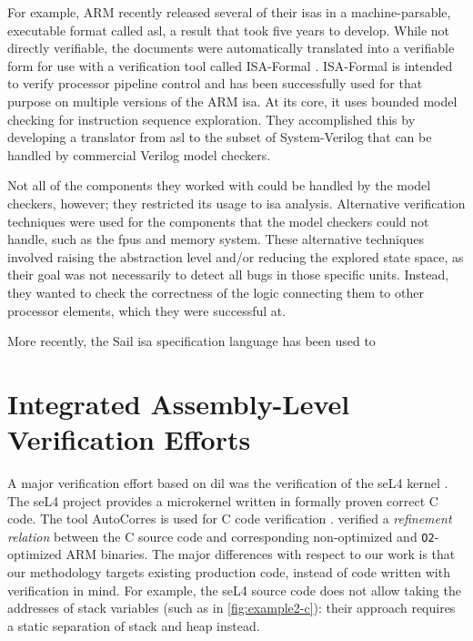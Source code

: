 For example, ARM recently released several of their \acp{isa} in a machine-parsable,
executable format called \ac{asl}, a result that took five years to develop.
While not directly verifiable, the documents were automatically translated into
a verifiable form for use with a verification tool
called ISA-Formal \autocite{reid2016endtoend}.
ISA-Formal is intended to verify processor pipeline control
and has been successfully used for that purpose on multiple versions of the ARM \ac{isa}.
At its core, it uses bounded model checking for instruction sequence exploration.
They accomplished this by developing a translator from \ac{asl}
to the subset of System-Verilog that can be handled by commercial Verilog model checkers.

Not all of the components they worked with could be handled by the model checkers,
however; they restricted its usage to \ac{isa} analysis.
Alternative verification techniques were used for the components that the model checkers
could not handle, such as the \acp{fpu} and memory system.
These alternative techniques involved raising the abstraction level
and/or reducing the explored state space,
as their goal was not necessarily to detect all bugs in those specific units.
Instead, they wanted to check the correctness of the logic connecting them
to other processor elements, which they were successful at.

More recently, the Sail \ac{isa} specification language has been used to

\section{Integrated Assembly-Level Verification Efforts}\label{se:integrated_assembly}
A major verification effort based on \acl{dil}
was the verification of the seL4 kernel \autocite{klein2009sel4,Klein_AEMSKH_14}.
The seL4 project provides a microkernel written in formally proven correct C code.
The tool AutoCorres is used for C code verification \autocite{greenaway2012bridging}.
\textcite{sewell2013tvv} verified a \emph{refinement relation} between the C source code
and corresponding non-optimized and \lstinline|O2|-optimized ARM binaries.
The major differences with respect to our work
is that our methodology targets existing production code,
instead of code written with verification in mind.
For example, the seL4 source code does not allow taking the addresses of stack variables
(such as in \cref{fig:example2-c}):
their approach requires a static separation of stack and heap instead.


